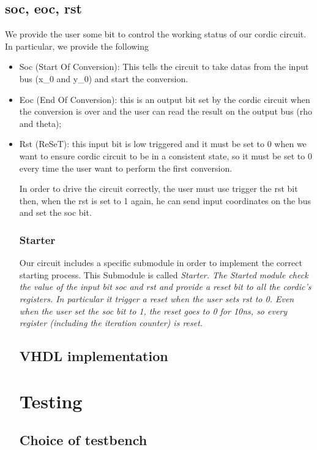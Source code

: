 \documentclass[12pt,a4paper]{report}
\begin{document}
\section{soc, eoc, rst}
We provide the user some bit to control the working status of our cordic circuit. In particular, we provide the following
\begin{itemize}
	\item{Soc (Start Of Conversion)}: This tells the circuit to take datas from the input bus (x_{0} and y_{0}) and start the conversion.
	\item{Eoc (End Of Conversion)}: this is an output bit set by the cordic circuit when the conversion is over and the user can read the result on the output bus (rho and theta);
	\item{Rst (ReSeT)}: this input bit is low triggered and it must be set to 0 when we want to ensure cordic circuit to be in a consistent state, so it must be set to 0 every time the user want to perform the first conversion.

In order to drive the circuit correctly, the user must use trigger the rst bit then, when the rst is set to 1 again, he can send input coordinates on the bus and set the soc bit.

\subsection{Starter}
Our circuit includes a specific submodule in order to implement the correct starting process. This Submodule is called \em{Starter}. The Started module check the value of the input bit soc and rst and provide a reset bit to all the cordic's registers. In particular it trigger a reset when the user sets rst to 0. Even when the user set the soc bit to 1, the reset goes to 0 for 10ns, so every register (including the iteration counter) is reset.


\section{VHDL implementation}




\chapter{Testing}

\section{Choice of testbench}

\end{itemize}
\end{document}
